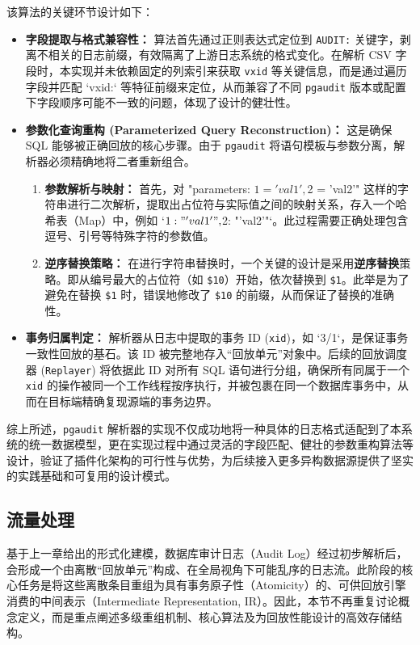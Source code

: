 该算法的关键环节设计如下：
\begin{itemize}
    \item \textbf{字段提取与格式兼容性：} 算法首先通过正则表达式定位到 \texttt{AUDIT:} 关键字，剥离不相关的日志前缀，有效隔离了上游日志系统的格式变化。在解析 CSV 字段时，本实现并未依赖固定的列索引来获取 \texttt{vxid} 等关键信息，而是通过遍历字段并匹配 `vxid:` 等特征前缀来定位，从而兼容了不同 \texttt{pgaudit} 版本或配置下字段顺序可能不一致的问题，体现了设计的健壮性。

    \item \textbf{参数化查询重构 (Parameterized Query Reconstruction)：} 这是确保 SQL 能够被正确回放的核心步骤。由于 \texttt{pgaudit} 将语句模板与参数分离，解析器必须精确地将二者重新组合。
    \begin{enumerate}
        \item \textbf{参数解析与映射：} 首先，对 "parameters: $1 = 'val1', $2 = 'val2'" 这样的字符串进行二次解析，提取出占位符与实际值之间的映射关系，存入一个哈希表（Map）中，例如 `{$1: "'val1'", $2: "'val2'"}`。此过程需要正确处理包含逗号、引号等特殊字符的参数值。
        \item \textbf{逆序替换策略：} 在进行字符串替换时，一个关键的设计是采用\textbf{逆序替换}策略。即从编号最大的占位符（如 \texttt{\$10}）开始，依次替换到 \texttt{\$1}。此举是为了避免在替换 \texttt{\$1} 时，错误地修改了 \texttt{\$10} 的前缀，从而保证了替换的准确性。
    \end{enumerate}

    \item \textbf{事务归属判定：} 解析器从日志中提取的事务 ID (\texttt{xid})，如 `3/1`，是保证事务一致性回放的基石。该 ID 被完整地存入“回放单元”对象中。后续的回放调度器 (\texttt{Replayer}) 将依据此 ID 对所有 SQL 语句进行分组，确保所有同属于一个 \texttt{xid} 的操作被同一个工作线程按序执行，并被包裹在同一个数据库事务中，从而在目标端精确复现源端的事务边界。
\end{itemize}

综上所述，\texttt{pgaudit} 解析器的实现不仅成功地将一种具体的日志格式适配到了本系统的统一数据模型，更在实现过程中通过灵活的字段匹配、健壮的参数重构算法等设计，验证了插件化架构的可行性与优势，为后续接入更多异构数据源提供了坚实的实践基础和可复用的设计模式。

\subsection{流量处理}
基于上一章给出的形式化建模，数据库审计日志（Audit Log）经过初步解析后，会形成一个由离散“回放单元”构成、在全局视角下可能乱序的日志流。此阶段的核心任务是将这些离散条目重组为具有事务原子性（Atomicity）的、可供回放引擎消费的中间表示（Intermediate Representation, IR）。因此，本节不再重复讨论概念定义，而是重点阐述多级重组机制、核心算法及为回放性能设计的高效存储结构。

